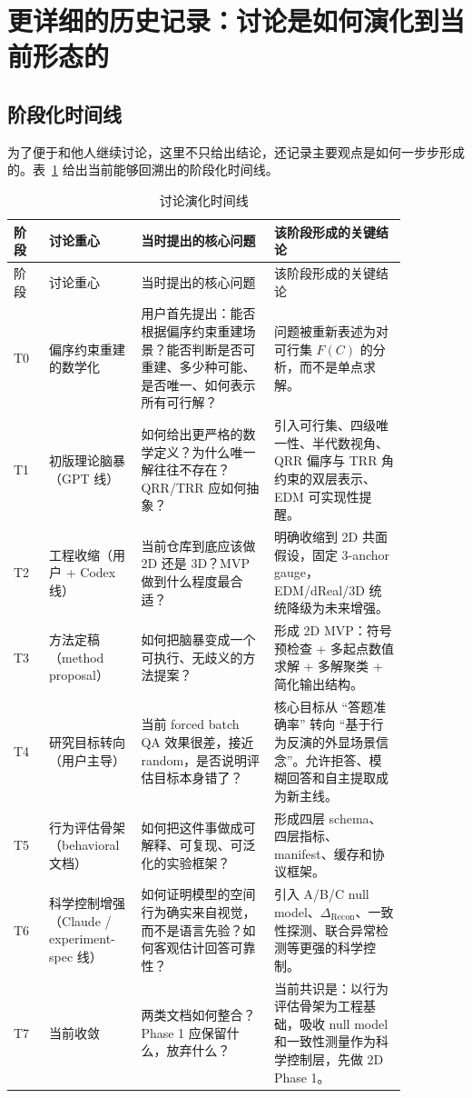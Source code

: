 \documentclass[11pt,a4paper]{ctexart}
\begin{document}
\section{更详细的历史记录：讨论是如何演化到当前形态的}

\subsection{阶段化时间线}

为了便于和他人继续讨论，这里不只给出结论，还记录主要观点是如何一步步形成的。表~\ref{tab:timeline} 给出当前能够回溯出的阶段化时间线。

\begin{longtable}{p{0.08\linewidth}p{0.18\linewidth}p{0.30\linewidth}p{0.30\linewidth}}
\caption{讨论演化时间线}\label{tab:timeline}\\
\toprule
阶段 & 讨论重心 & 当时提出的核心问题 & 该阶段形成的关键结论 \\
\midrule
\endfirsthead
\toprule
阶段 & 讨论重心 & 当时提出的核心问题 & 该阶段形成的关键结论 \\
\midrule
\endhead
T0 & 偏序约束重建的数学化 & 用户首先提出：能否根据偏序约束重建场景？能否判断是否可重建、多少种可能、是否唯一、如何表示所有可行解？ & 问题被重新表述为对可行集 $F(C)$ 的分析，而不是单点求解。 \\
T1 & 初版理论脑暴（GPT 线） & 如何给出更严格的数学定义？为什么唯一解往往不存在？QRR/TRR 应如何抽象？ & 引入可行集、四级唯一性、半代数视角、QRR 偏序与 TRR 角约束的双层表示、EDM 可实现性提醒。 \\
T2 & 工程收缩（用户 + Codex 线） & 当前仓库到底应该做 2D 还是 3D？MVP 做到什么程度最合适？ & 明确收缩到 2D 共面假设，固定 3-anchor gauge，EDM/dReal/3D 统统降级为未来增强。 \\
T3 & 方法定稿（method proposal） & 如何把脑暴变成一个可执行、无歧义的方法提案？ & 形成 2D MVP：符号预检查 + 多起点数值求解 + 多解聚类 + 简化输出结构。 \\
T4 & 研究目标转向（用户主导） & 当前 forced batch QA 效果很差，接近 random，是否说明评估目标本身错了？ & 核心目标从 ``答题准确率'' 转向 ``基于行为反演的外显场景信念''。允许拒答、模糊回答和自主提取成为新主线。 \\
T5 & 行为评估骨架（behavioral 文档） & 如何把这件事做成可解释、可复现、可泛化的实验框架？ & 形成四层 schema、四层指标、manifest、缓存和协议框架。 \\
T6 & 科学控制增强（Claude / experiment-spec 线） & 如何证明模型的空间行为确实来自视觉，而不是语言先验？如何客观估计回答可靠性？ & 引入 A/B/C null model、$\Delta_{\mathrm{Recon}}$、一致性探测、联合异常检测等更强的科学控制。 \\
T7 & 当前收敛 & 两类文档如何整合？Phase 1 应保留什么，放弃什么？ & 当前共识是：以行为评估骨架为工程基础，吸收 null model 和一致性测量作为科学控制层，先做 2D Phase 1。 \\
\bottomrule
\end{longtable}
\end{document}
